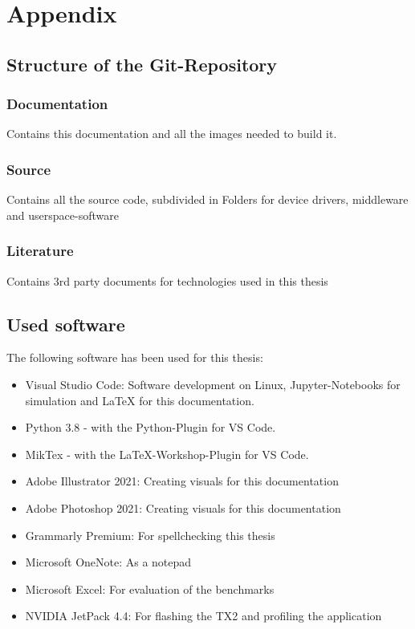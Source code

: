 \chapter{Appendix}
\label{sec:Anhang}

\section{Structure of the Git-Repository}
\label{sec:Anhang_struktur}
\subsection{Documentation}
Contains this documentation and all the images needed to build it.
\subsection{Source}
Contains all the source code, subdivided in Folders for device drivers, middleware and userspace-software
\subsection{Literature}
Contains 3rd party documents for technologies used in this thesis

\section{Used software}
\label{sec:usedSoftware}
The following software has been used for this thesis:
\begin{itemize} %
	\item Visual Studio Code: Software development on Linux, Jupyter-Notebooks for simulation and LaTeX for this documentation.
	\item Python 3.8 - with the Python-Plugin for VS Code.
	\item MikTex - with the LaTeX-Workshop-Plugin for VS Code.
	\item Adobe Illustrator 2021: Creating visuals for this documentation
	\item Adobe Photoshop 2021: Creating visuals for this documentation
	\item Grammarly Premium: For spellchecking this thesis
	\item Microsoft OneNote: As a notepad
	\item Microsoft Excel: For evaluation of the benchmarks
	\item NVIDIA JetPack 4.4: For flashing the TX2 and profiling the application
\end{itemize}